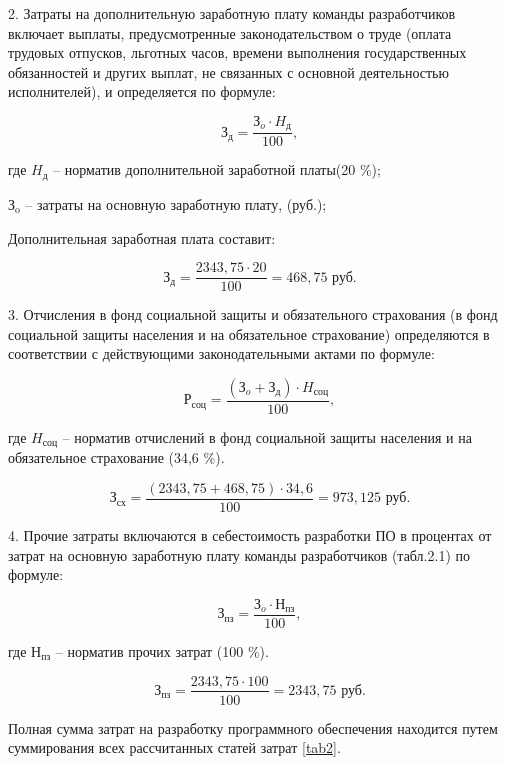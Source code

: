 2. Затраты на дополнительную заработную плату команды разработчиков включает выплаты, предусмотренные законодательством о труде (оплата трудовых отпусков, льготных часов, времени выполнения государственных обязанностей и других выплат, не связанных с основной деятельностью исполнителей), и определяется по формуле:

\begin{equation}
    \text{З}_{\text{д}} = \frac{\text{З}_{o}\cdot H_\text{д}}{100},
\end{equation}


где $H_\text{д}$ -- норматив дополнительной              заработной платы(20 \%);

   $\text{З}_{\text{o}}$ -- затраты на основную заработную плату, (руб.);




Дополнительная заработная плата составит:

$$
\text{З}_{\text{д}} = \frac{2343,75 \cdot 20}{100} = 468,75 \text{ руб}.
$$

3. Отчисления в фонд социальной защиты и обязательного страхования (в фонд социальной защиты населения и на обязательное страхование) определяются в соответствии с действующими законодательными актами по формуле: 

\begin{equation}
    \text{Р}_{\text{соц}} = \frac{(\text{З}_{o} + \text{З}_{\text{д}})\cdot H_\text{соц}}{100},
\end{equation}
 
где $H_\text{соц}$ -- норматив отчислений в фонд социальной защиты населения и на обязательное страхование (34,6 \%).
 
$$
 \text{З}_{\text{сх}} = \frac{(2343,75 + 468,75)\cdot 34,6}{100} = 973,125 \text{ руб}.
$$

4. Прочие затраты включаются в себестоимость разработки ПО в процентах от затрат на основную заработную плату команды разработчиков (табл.2.1) по формуле:

\begin{equation}
    \text{З}_{\text{пз}} = \frac{\text{З}_{o} \cdot \text{Н}_{\text{пз}}}{100},
\end{equation}

где $\text{Н}_{\text{пз}}$ -- норматив прочих затрат (100 \%).

$$
 \text{З}_{\text{пз}} = \frac{2343,75 \cdot 100}{100} = 2343,75 \text{ руб}.
$$

Полная сумма затрат на разработку программного обеспечения находится
путем суммирования всех рассчитанных статей затрат \ref{tab2}.

